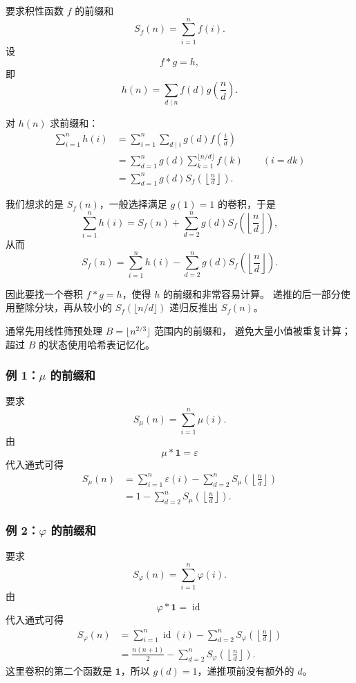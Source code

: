 要求积性函数 $f$ 的前缀和
\[
  S_f(n)=\sum_{i=1}^{n}f(i).
\]
设
\[
  f*g=h,
\]
即
\[
  h(n)=\sum_{d\mid n}f(d)g\!\left(\frac nd\right).
\]

对 $h(n)$ 求前缀和：
\[
  \begin{aligned}
  \sum_{i=1}^{n}h(i)
  &=\sum_{i=1}^{n}\sum_{d\mid i}g(d)f\!\left(\frac id\right)\\
  &=\sum_{d=1}^{n}g(d)
    \sum_{k=1}^{\lfloor n/d\rfloor}f(k)
    \qquad(i=dk)\\
  &=\sum_{d=1}^{n}g(d)S_f\!\left(\left\lfloor\frac nd\right\rfloor\right).
  \end{aligned}
\]

我们想求的是 $S_f(n)$，一般选择满足 $g(1)=1$ 的卷积，于是
\[
  \sum_{i=1}^{n}h(i)
  =S_f(n)+\sum_{d=2}^{n}g(d)
    S_f\!\left(\left\lfloor\frac nd\right\rfloor\right),
\]
从而
\[
  S_f(n)
  =\sum_{i=1}^{n}h(i)-\sum_{d=2}^{n}g(d)
    S_f\!\left(\left\lfloor\frac nd\right\rfloor\right).
\]

因此要找一个卷积 $f*g=h$，使得 $h$ 的前缀和非常容易计算。
递推的后一部分使用整除分块，再从较小的
$S_f(\lfloor n/d\rfloor)$ 递归反推出 $S_f(n)$。

通常先用线性筛预处理 $B=\lfloor n^{2/3}\rfloor$ 范围内的前缀和，
避免大量小值被重复计算；超过 $B$ 的状态使用哈希表记忆化。

\subsubsection{例 1：$\mu$ 的前缀和}

要求
\[
  S_\mu(n)=\sum_{i=1}^{n}\mu(i).
\]
由
\[
  \mu*\mathbf 1=\varepsilon
\]
代入通式可得
\[
  \begin{aligned}
  S_\mu(n)
  &=\sum_{i=1}^{n}\varepsilon(i)
    -\sum_{d=2}^{n}S_\mu\!\left(\left\lfloor\frac nd\right\rfloor\right)\\
  &=1-\sum_{d=2}^{n}S_\mu\!\left(\left\lfloor\frac nd\right\rfloor\right).
  \end{aligned}
\]

\subsubsection{例 2：$\varphi$ 的前缀和}

要求
\[
  S_\varphi(n)=\sum_{i=1}^{n}\varphi(i).
\]
由
\[
  \varphi*\mathbf 1=\operatorname{id}
\]
代入通式可得
\[
  \begin{aligned}
  S_\varphi(n)
  &=\sum_{i=1}^{n}\operatorname{id}(i)
    -\sum_{d=2}^{n}S_\varphi\!\left(\left\lfloor\frac nd\right\rfloor\right)\\
  &=\frac{n(n+1)}2
    -\sum_{d=2}^{n}S_\varphi\!\left(\left\lfloor\frac nd\right\rfloor\right).
  \end{aligned}
\]
这里卷积的第二个函数是 $\mathbf 1$，所以 $g(d)=1$，递推项前没有额外的 $d$。

